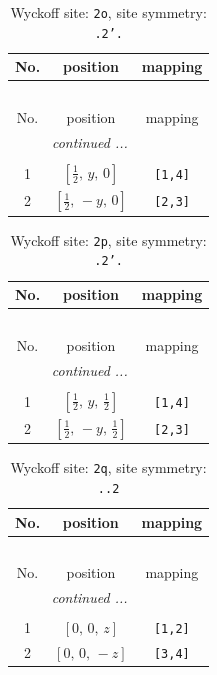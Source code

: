 \documentclass[fleqn,8pt]{jsarticle}
\begin{document}
\renewcommand{\arraystretch}{1.2}
\begin{longtable}{ccc}
\caption{Wyckoff site: {\tt 2o}, site symmetry: {\tt .2'.}}
 \\
 \hline \hline
No. & position & mapping \\ \hline \endfirsthead

\multicolumn{2}{l}{\tablename\ \thetable{}} \\
 \hline \hline
No. & position & mapping \\ \hline \endhead

 \hline \hline
\multicolumn{2}{r}{\footnotesize\it continued ...} \\ \endfoot

 \hline \hline
\multicolumn{2}{r}{} \\ \endlastfoot

1 & $\left[ \frac{1}{2},\, y,\, 0 \right]$ & {\tt [1,4]} \\ \hline
2 & $\left[ \frac{1}{2},\, - y,\, 0 \right]$ & {\tt [2,3]} \\
\end{longtable}
\renewcommand{\arraystretch}{1.2}
\begin{longtable}{ccc}
\caption{Wyckoff site: {\tt 2p}, site symmetry: {\tt .2'.}}
 \\
 \hline \hline
No. & position & mapping \\ \hline \endfirsthead

\multicolumn{2}{l}{\tablename\ \thetable{}} \\
 \hline \hline
No. & position & mapping \\ \hline \endhead

 \hline \hline
\multicolumn{2}{r}{\footnotesize\it continued ...} \\ \endfoot

 \hline \hline
\multicolumn{2}{r}{} \\ \endlastfoot

1 & $\left[ \frac{1}{2},\, y,\, \frac{1}{2} \right]$ & {\tt [1,4]} \\ \hline
2 & $\left[ \frac{1}{2},\, - y,\, \frac{1}{2} \right]$ & {\tt [2,3]} \\
\end{longtable}
\renewcommand{\arraystretch}{1.2}
\begin{longtable}{ccc}
\caption{Wyckoff site: {\tt 2q}, site symmetry: {\tt ..2}}
 \\
 \hline \hline
No. & position & mapping \\ \hline \endfirsthead

\multicolumn{2}{l}{\tablename\ \thetable{}} \\
 \hline \hline
No. & position & mapping \\ \hline \endhead

 \hline \hline
\multicolumn{2}{r}{\footnotesize\it continued ...} \\ \endfoot

 \hline \hline
\multicolumn{2}{r}{} \\ \endlastfoot

1 & $\left[ 0,\, 0,\, z \right]$ & {\tt [1,2]} \\ \hline
2 & $\left[ 0,\, 0,\, - z \right]$ & {\tt [3,4]} \\
\end{longtable}
\end{document}

